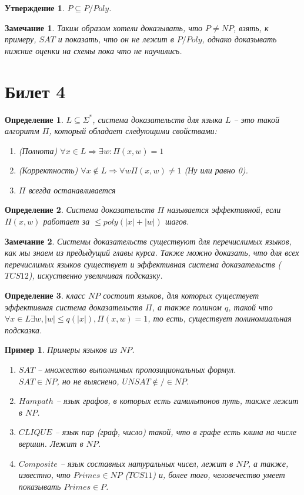 \documentclass[12pt, letterpaper]{article}
\newtheorem{prop}{Утверждение}[section]
\newtheorem{defi}{Определение}[section]
\newtheorem{sample}{Пример}[section]
\newtheorem{note}{Замечание}[section]
\begin{document}
\begin{prop}
$P \subseteq P/Poly$.
\end{prop}

\begin{note}
Таким образом хотели доказывать, что $P \neq NP$, взять, к примеру, $SAT$ и показать, что он не лежит в $P / Poly$, однако доказывать нижние оценки на схемы пока что не научились.
\end{note}

\section{Билет 4}
\begin{defi}
$L \subseteq \Sigma^{*}$, система доказательств для языка $L$ -- это такой алгоритм $\Pi$, который обладает следующими свойствами:
\begin{enumerate}
\item (Полнота) $\forall x \in L \Rightarrow \exists w : \Pi(x,w)=1$
\item (Корректность) $\forall x \notin L \Rightarrow \forall w \Pi(x,w) \neq 1$ 
(Ну или равно 0).
\item $\Pi$ всегда останавливается  
\end{enumerate}
\end{defi}

\begin{defi}
Система доказательств $\Pi$ называется эффективной, если $\Pi(x,w)$ работает за $\leq poly(|x|+|w|)$ шагов.
\end{defi}

\begin{note}
Системы доказательств существуют для перечислимых языков, как мы знаем из предыдущий главы курса. Также можно доказать, что для всех перечислимых языков существует и эффективная система доказательств ($TCS12$), искуственно увеличивая подсказку.
\end{note}

\begin{defi}
класс $NP$ состоит языков, для которых существует эффективная система доказательств $\Pi$, а также полином $q$, такой что $\forall x \in L \exists w, |w| \leq q(|x|), \Pi(x,w)=1$, то есть, существует полиномиальная подсказка.
\end{defi}

\begin{sample}
Примеры языков из $NP$.
\begin{enumerate}
\item $SAT$ -- множество выполнимых пропозициональных формул. \\
$SAT \in NP$, но не выяснено, $UNSAT \notin/\in NP$.
\item $Hampath$ -- язык графов, в которых есть гамильтонов путь, также лежит в $NP$.
\item $CLIQUE$ -- язык пар (граф, число) такой, что в графе есть клина на числе вершин. Лежит в $NP$.
\item $Composite$ -- язык составных натуральных чисел, лежит в $NP$, а также, известно, что $Primes \in NP$ ($TCS11$) и, более того, человечество умеет показывать $Primes \in P$.  
\end{enumerate}
\end{sample}
\end{document}
